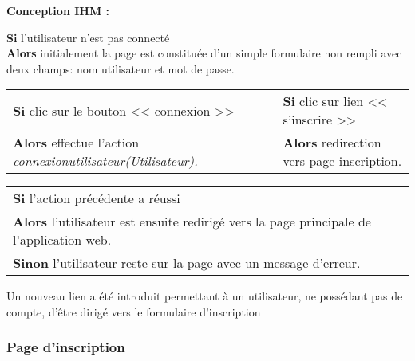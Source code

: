 			\begin{paragraphe}
				\textbf{Conception IHM :}
			\end{paragraphe}

			\begin{paragraphe}
				\textbf{Si} l'utilisateur n'est pas connecté \\
				\textbf{Alors} initialement la page est constituée d'un simple formulaire non rempli avec deux champs: nom utilisateur et mot de passe.
			\end{paragraphe}

            \begin{center}
                \begin{tabular}{l c | c l}
                    \textbf{Si} clic sur le bouton << connexion >> & & & \textbf{Si} clic sur lien  << s'inscrire >> \\
                    \textbf{Alors} effectue l'action \emph{connexionutilisateur(Utilisateur).} & & & \textbf{Alors} redirection vers page inscription.
                \end{tabular}
            \end{center}

            \begin{center}
                \begin{tabular}{l}
                    \textbf{Si} l'action précédente a réussi \\
                    \textbf{Alors} l'utilisateur est ensuite redirigé vers la page principale de l'application web. \\
                    \textbf{Sinon} l'utilisateur reste sur la page avec un message d'erreur.
                \end{tabular}
            \end{center}


        \newpage
        
            \begin{paragraphe}
                Un nouveau lien a été introduit permettant à un utilisateur, ne possédant pas de compte, d'être dirigé vers le formulaire d'inscription
            \end{paragraphe}


    \clearpage

		\subsubsection{Page d'inscription}

